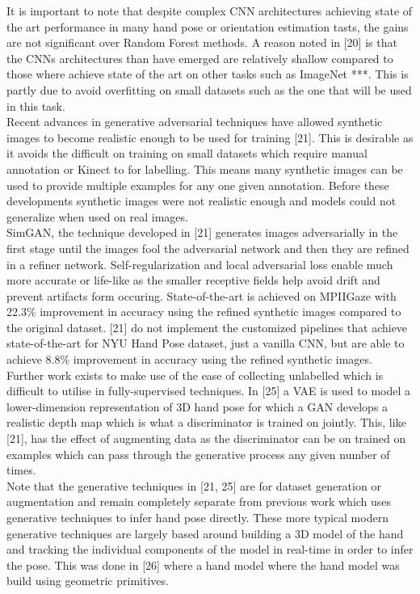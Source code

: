\documentclass{article}
\begin{document}
It is important to note that despite complex CNN architectures achieving state of the art performance in many hand pose or orientation estimation tasts, the gains are not significant over Random Forest methods. A reason noted in [20] is that the CNNs architectures than have emerged are relatively shallow compared to those where achieve state of the art on other tasks such as ImageNet ***. This is partly due to avoid overfitting on small datasets such as the one that will be used in this task. \\

Recent advances in generative adversarial techniques have allowed synthetic images to become realistic enough to be used for training [21]. This is desirable as it avoids the difficult on training on small datasets which require manual annotation or  Kinect to for labelling. This means many synthetic images can be used to provide multiple examples for any one given annotation. Before these developments synthetic images were not realistic enough and models could not generalize when used on real images.\\

SimGAN, the technique developed in [21] generates images adversarially in the first stage until the images fool the adversarial network and then they are refined  in a refiner network. Self-regularization and local adversarial loss enable much more accurate or life-like as the smaller receptive fields help avoid drift and prevent artifacts form occuring. State-of-the-art is achieved on MPIIGaze with 22.3\% improvement in accuracy using the refined synthetic images compared to the original dataset. [21] do not implement the customized pipelines that achieve state-of-the-art for NYU Hand Pose dataset, just a vanilla CNN, but are able to achieve 8.8\% improvement in accuracy using the refined synthetic images.\\

Further work exists to make use of the ease of collecting unlabelled which is difficult to utilise in fully-supervised techniques. In [25] a VAE is used to model a lower-dimension representation of 3D hand pose for which a GAN develops a realistic depth map which is what a discriminator is trained on jointly. This, like [21], has the effect of augmenting data as the discriminator can be on trained on examples which can pass through the generative process any given number of times.\\

Note that the generative techniques in [21, 25] are for dataset generation or augmentation and remain completely separate from previous work which uses generative techniques to infer hand pose directly. These more typical modern generative techniques are largely based around building a 3D model of the hand and tracking the individual components of the model in real-time in order to infer the pose. This was done  in [26] where a hand model  where the hand model was build using geometric primitives.\\
\end{document}
